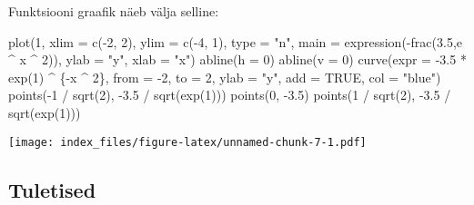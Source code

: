 \documentclass[
]{article}
\newenvironment{Shaded}{\begin{snugshade}}{\end{snugshade}}
\newcommand{\AttributeTok}[1]{\textcolor[rgb]{0.77,0.63,0.00}{#1}}
\newcommand{\ConstantTok}[1]{\textcolor[rgb]{0.00,0.00,0.00}{#1}}
\newcommand{\DecValTok}[1]{\textcolor[rgb]{0.00,0.00,0.81}{#1}}
\newcommand{\FloatTok}[1]{\textcolor[rgb]{0.00,0.00,0.81}{#1}}
\newcommand{\FunctionTok}[1]{\textcolor[rgb]{0.00,0.00,0.00}{#1}}
\newcommand{\NormalTok}[1]{#1}
\newcommand{\SpecialCharTok}[1]{\textcolor[rgb]{0.00,0.00,0.00}{#1}}
\newcommand{\StringTok}[1]{\textcolor[rgb]{0.31,0.60,0.02}{#1}}
\begin{document}
Funktsiooni graafik näeb välja selline:

\begin{Shaded}
\begin{Highlighting}[]
\FunctionTok{plot}\NormalTok{(}\DecValTok{1}\NormalTok{, }
     \AttributeTok{xlim =} \FunctionTok{c}\NormalTok{(}\SpecialCharTok{{-}}\DecValTok{2}\NormalTok{, }\DecValTok{2}\NormalTok{), }\AttributeTok{ylim =} \FunctionTok{c}\NormalTok{(}\SpecialCharTok{{-}}\DecValTok{4}\NormalTok{, }\DecValTok{1}\NormalTok{),}
     \AttributeTok{type =} \StringTok{"n"}\NormalTok{, }
     \AttributeTok{main =} \FunctionTok{expression}\NormalTok{(}\SpecialCharTok{{-}}\FunctionTok{frac}\NormalTok{(}\FloatTok{3.5}\NormalTok{,e }\SpecialCharTok{\^{}}\NormalTok{ x }\SpecialCharTok{\^{}} \DecValTok{2}\NormalTok{)),}
     \AttributeTok{ylab =} \StringTok{"y"}\NormalTok{, }\AttributeTok{xlab =} \StringTok{"x"}\NormalTok{)}
\FunctionTok{abline}\NormalTok{(}\AttributeTok{h =} \DecValTok{0}\NormalTok{)}
\FunctionTok{abline}\NormalTok{(}\AttributeTok{v =} \DecValTok{0}\NormalTok{)}
\FunctionTok{curve}\NormalTok{(}\AttributeTok{expr =} \SpecialCharTok{{-}}\FloatTok{3.5} \SpecialCharTok{*} \FunctionTok{exp}\NormalTok{(}\DecValTok{1}\NormalTok{) }\SpecialCharTok{\^{}}\NormalTok{ \{}\SpecialCharTok{{-}}\NormalTok{x }\SpecialCharTok{\^{}} \DecValTok{2}\NormalTok{\}, }\AttributeTok{from =} \SpecialCharTok{{-}}\DecValTok{2}\NormalTok{, }\AttributeTok{to =} \DecValTok{2}\NormalTok{, }\AttributeTok{ylab =} \StringTok{"y"}\NormalTok{, }\AttributeTok{add =} \ConstantTok{TRUE}\NormalTok{, }\AttributeTok{col =} \StringTok{"blue"}\NormalTok{)}
\FunctionTok{points}\NormalTok{(}\SpecialCharTok{{-}}\DecValTok{1} \SpecialCharTok{/} \FunctionTok{sqrt}\NormalTok{(}\DecValTok{2}\NormalTok{), }\SpecialCharTok{{-}}\FloatTok{3.5} \SpecialCharTok{/} \FunctionTok{sqrt}\NormalTok{(}\FunctionTok{exp}\NormalTok{(}\DecValTok{1}\NormalTok{)))}
\FunctionTok{points}\NormalTok{(}\DecValTok{0}\NormalTok{, }\SpecialCharTok{{-}}\FloatTok{3.5}\NormalTok{)}
\FunctionTok{points}\NormalTok{(}\DecValTok{1} \SpecialCharTok{/} \FunctionTok{sqrt}\NormalTok{(}\DecValTok{2}\NormalTok{), }\SpecialCharTok{{-}}\FloatTok{3.5} \SpecialCharTok{/} \FunctionTok{sqrt}\NormalTok{(}\FunctionTok{exp}\NormalTok{(}\DecValTok{1}\NormalTok{)))}
\end{Highlighting}
\end{Shaded}

\texttt{[image: index\_files/figure-latex/unnamed-chunk-7-1.pdf]}

\hypertarget{tuletised}{%
\subsection{Tuletised}\label{tuletised}}
\end{document}

